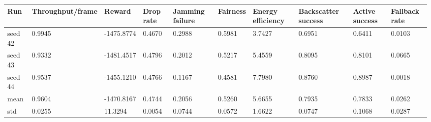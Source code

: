 \begin{tabular}{llllllllll}
\hline
Run & Throughput/frame & Reward & Drop rate & Jamming failure & Fairness & Energy efficiency & Backscatter success & Active success & Fallback rate \\
\hline
seed 42 & 0.9945 & -1475.8774 & 0.4670 & 0.2988 & 0.5981 & 3.7427 & 0.6951 & 0.6411 & 0.0103 \\
seed 43 & 0.9332 & -1481.4517 & 0.4796 & 0.2012 & 0.5217 & 5.4559 & 0.8095 & 0.8101 & 0.0665 \\
seed 44 & 0.9537 & -1455.1210 & 0.4766 & 0.1167 & 0.4581 & 7.7980 & 0.8760 & 0.8987 & 0.0018 \\
mean & 0.9604 & -1470.8167 & 0.4744 & 0.2056 & 0.5260 & 5.6655 & 0.7935 & 0.7833 & 0.0262 \\
std & 0.0255 & 11.3294 & 0.0054 & 0.0744 & 0.0572 & 1.6622 & 0.0747 & 0.1068 & 0.0287 \\
\hline
\end{tabular}
